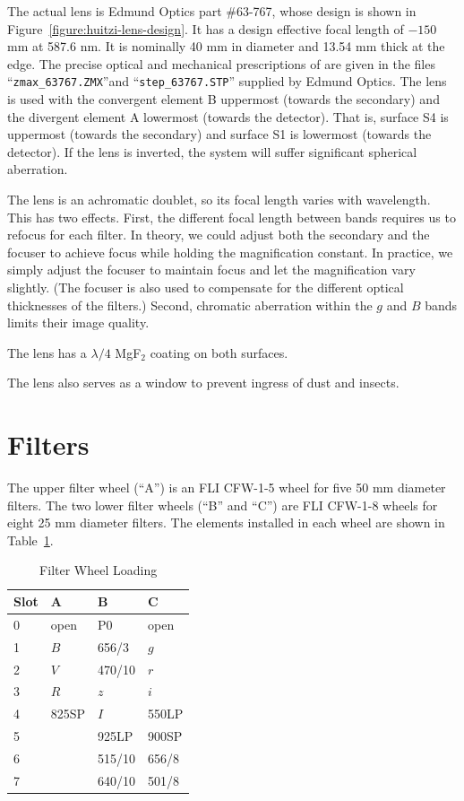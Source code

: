 The actual lens is Edmund Optics part \#63-767, whose design is shown in Figure~\ref{figure:huitzi-lens-design}. It has a design effective focal length of $-150$ mm at 587.6 nm. It is nominally 40 mm in diameter and 13.54 mm thick at the edge. The precise optical and mechanical prescriptions of are given in the files “\verb|zmax_63767.ZMX|”and “\verb|step_63767.STP|” supplied by Edmund Optics. The lens is used with the convergent element B uppermost (towards the secondary) and the divergent element A lowermost (towards the detector). That is, surface S4 is uppermost (towards the secondary) and surface S1 is lowermost (towards the detector). If the lens is inverted, the system will suffer significant spherical aberration.

The lens is an achromatic doublet, so its focal length varies with wavelength. This has two effects. First, the different focal length between bands requires us to refocus for each filter. In theory, we could adjust both the secondary and the focuser to achieve focus while holding the magnification constant. In practice, we simply adjust the focuser to maintain focus and let the magnification vary slightly. (The focuser is also used to compensate for the different optical thicknesses of the filters.) Second, chromatic aberration within the $g$ and $B$ bands limits their image quality.

The lens has a $\lambda/4$ MgF$_2$ coating on both surfaces.

The lens also serves as a window to prevent ingress of dust and insects.

\section{Filters}

The upper filter wheel (“A”) is an FLI CFW-1-5 wheel for five 50 mm diameter filters. The two lower filter wheels (“B” and “C”) are FLI CFW-1-8 wheels for eight 25 mm diameter filters. The elements installed in each wheel are shown in Table~\ref{table:filter-wheel-loading}.

\begin{table}
\begin{center}
\caption{Filter Wheel Loading}
\label{table:filter-wheel-loading}
\medskip
\begin{tabular}{llll}
\hline
Slot&A&B&C\\
\hline
0&open	&P0			&open		\\
1&$B$	&656/3		&$g$		\\
2&$V$	&470/10		&$r$		\\
3&$R$	&$z$			&$i$		\\
4&825SP	&$I$			&550LP	\\
5&			&925LP		&900SP	\\
6&			&515/10		&656/8	\\
7&			&640/10		&501/8	\\
\hline
\end{tabular}
\end{center}
\end{table}

